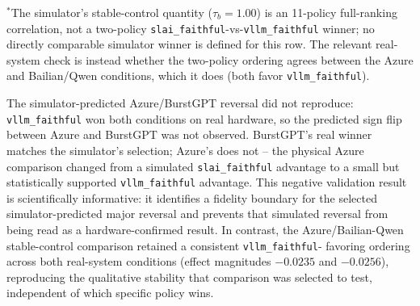 \begin{table}[t]
\centering
\caption{Real-vLLM RQ6 outcomes against the simulator-selected cases (\texttt{HIGH\_PRESSURE}, 40 paired windows/source, 95\% window-level bootstrap CI, $2{,}000$ resamples). Effect is \texttt{slai\_faithful}$-$\texttt{vllm\_faithful} ANWG.}
\label{tab:rq6-results}
\small
\setlength{\tabcolsep}{4.5pt}
\vspace{2pt}

{\footnotesize $^{*}$The simulator's stable-control quantity ($\tau_b = 1.00$) is an
11-policy full-ranking correlation, not a two-policy \texttt{slai\_faithful}-vs-\texttt{vllm\_faithful}
winner; no directly comparable simulator winner is defined for this row. The
relevant real-system check is instead whether the two-policy ordering agrees
between the Azure and Bailian/Qwen conditions, which it does (both favor
\texttt{vllm\_faithful}).}
\end{table}

The simulator-predicted Azure/BurstGPT reversal did not reproduce:
\texttt{vllm\_faithful} won both conditions on real hardware, so the
predicted sign flip between Azure and BurstGPT was not observed. BurstGPT's
real winner matches the simulator's selection; Azure's does not -- the
physical Azure comparison changed from a simulated \texttt{slai\_faithful}
advantage to a small but statistically supported \texttt{vllm\_faithful}
advantage. This negative validation result is scientifically informative:
it identifies a fidelity boundary for the selected simulator-predicted
major reversal and prevents that simulated reversal from being read as a
hardware-confirmed result. In contrast, the Azure/Bailian-Qwen
stable-control comparison retained a consistent \texttt{vllm\_faithful}-
favoring ordering across both real-system conditions (effect magnitudes
$-0.0235$ and $-0.0256$), reproducing the qualitative stability that
comparison was selected to test, independent of which specific policy wins.

